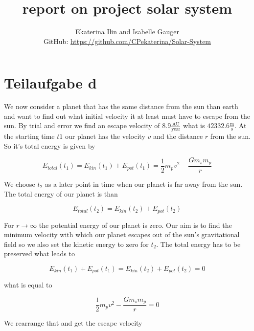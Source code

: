 \documentclass[11pt,a4wide]{article}
\begin{document}
\title{report on project solar system}
\author{Ekaterina Ilin and Isabelle Gauger\\GitHub: \url{https://github.com/CPekaterina/Solar-System}
}
\maketitle
\tableofcontents
\newpage
\section{Teilaufgabe d}

We now consider a planet that has the same distance from the sun than earth and want to find out what initial velocity it at least must have to escape from the sun. By trial and error we find an escape velocity of $8.9\frac{\text{AU}}{\text{year}}$ what is $42332.6\frac{\text{m}}{\text{s}}$. At the starting time $t1$ our planet has the velocity $v$ and the distance $r$ from the sun. So it's total energy is given by

\begin{equation}
E_{total}\left(t_1\right) = E_{kin}\left(t_1\right) + E_{pot}\left(t_1\right) = \frac{1}{2}m_{p}v^2 - \frac{Gm_{s}m_{p}}{r}
\end{equation}

We choose $t_2$ as a later point in time when our planet is far away from the sun. The total energy of our planet is than

\begin{equation}
E_{total}\left(t_2\right) = E_{kin}\left(t_2\right) + E_{pot}\left(t_2\right) 
\end{equation}

For $r\rightarrow\infty$ the potential energy of our planet is zero. Our aim is to find the minimum velocity with which our planet escapes out of the sun's gravitational field so we also set the kinetic energy to zero for $t_2$. The total energy has to be preserved what leads to

\begin{equation}
E_{kin}\left(t_1\right) + E_{pot}\left(t_1\right) = E_{kin}\left(t_2\right) + E_{pot}\left(t_2\right) = 0
\end{equation}

what is equal to 

\begin{equation}
\frac{1}{2}m_{p}v^2 - \frac{Gm_{s}m_{p}}{r} = 0
\end{equation}

We rearrange that and get the escape velocity
\end{document}
